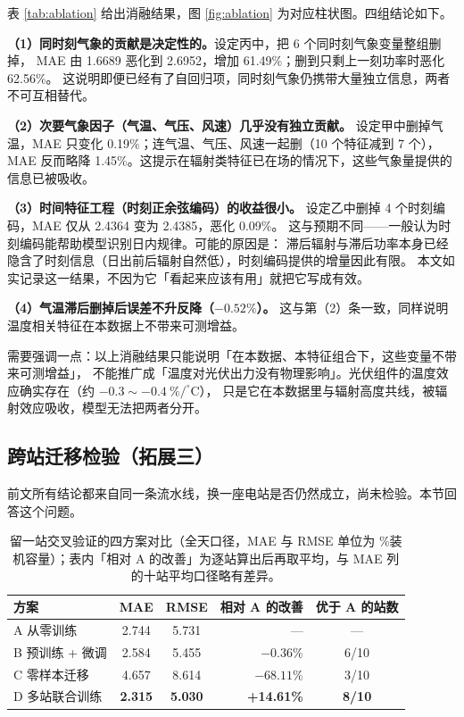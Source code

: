 \documentclass[11pt,a4paper]{ctexart}
\begin{document}
表 \ref{tab:ablation} 给出消融结果，图 \ref{fig:ablation} 为对应柱状图。四组结论如下。

\textbf{（1）同时刻气象的贡献是决定性的。}设定丙中，把 6 个同时刻气象变量整组删掉，
MAE 由 1.6689 恶化到 2.6952，增加 61.49\%；删到只剩上一刻功率时恶化 62.56\%。
这说明即便已经有了自回归项，同时刻气象仍携带大量独立信息，两者不可互相替代。

\textbf{（2）次要气象因子（气温、气压、风速）几乎没有独立贡献。}
设定甲中删掉气温，MAE 只变化 0.19\%；连气温、气压、风速一起删（10 个特征减到 7 个），
MAE 反而略降 1.45\%。这提示在辐射类特征已在场的情况下，这些气象量提供的信息已被吸收。

\textbf{（3）时间特征工程（时刻正余弦编码）的收益很小。}
设定乙中删掉 4 个时刻编码，MAE 仅从 2.4364 变为 2.4385，恶化 0.09\%。
这与预期不同——一般认为时刻编码能帮助模型识别日内规律。可能的原因是：
滞后辐射与滞后功率本身已经隐含了时刻信息（日出前后辐射自然低），时刻编码提供的增量因此有限。
本文如实记录这一结果，不因为它「看起来应该有用」就把它写成有效。

\textbf{（4）气温滞后删掉后误差不升反降（$-0.52\%$）。}
这与第（2）条一致，同样说明温度相关特征在本数据上不带来可测增益。

需要强调一点：以上消融结果只能说明「在本数据、本特征组合下，这些变量不带来可测增益」，
不能推广成「温度对光伏出力没有物理影响」。光伏组件的温度效应确实存在（约 $-0.3 \sim -0.4\ \%/^{\circ}\mathrm{C}$），
只是它在本数据里与辐射高度共线，被辐射效应吸收，模型无法把两者分开。

\subsection{跨站迁移检验（拓展三）}
\label{sec:transfer}

前文所有结论都来自同一条流水线，换一座电站是否仍然成立，尚未检验。本节回答这个问题。

\begin{table}[htbp]
\centering
\caption{留一站交叉验证的四方案对比（全天口径，MAE 与 RMSE 单位为 \%装机容量）；表内「相对 A 的改善」为逐站算出后再取平均，与 MAE 列的十站平均口径略有差异。}
\label{tab:transfer}
\begin{tabular}{lccrc}
\toprule
方案 & MAE & RMSE & 相对 A 的改善 & 优于 A 的站数 \\
\midrule
A 从零训练      & 2.744 & 5.731  & ---         & ---   \\
B 预训练 + 微调 & 2.584 & 5.455  & $-0.36\%$   & 6/10  \\
C 零样本迁移    & 4.657 & 8.614  & $-68.11\%$  & 3/10  \\
D 多站联合训练  & \textbf{2.315} & \textbf{5.030} & \textbf{+14.61\%} & \textbf{8/10} \\
\bottomrule
\end{tabular}
\end{table}
\end{document}
